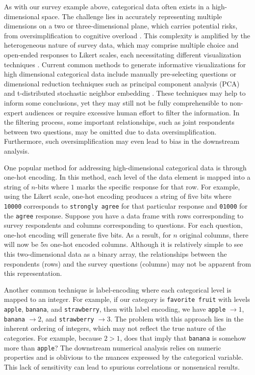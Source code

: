 As with our survey example above, categorical data often exists in a high-dimensional space. The challenge lies in accurately representing multiple dimensions on a two or three-dimensional plane, which carries potential risks, from oversimplification to cognitive overload \cite{fayyad2002information}. This complexity is amplified by the heterogeneous nature of survey data, which may comprise multiple choice and open-ended responses to Likert scales, each necessitating different visualization techniques \cite{shneiderman1996eyes}. Current common methods to generate informative visualizations for high dimensional categorical data include manually pre-selecting questions or dimensional reduction techniques such as principal component analysis (PCA) and t-distributed stochastic neighbor embedding \cite{Wong1997MultivariateVU}. These techniques may help to inform some conclusions, yet they may still not be fully comprehensible to non-expert audiences or require excessive human effort to filter the information. In the filtering process, some important relationships, such as joint respondents between two questions, may be omitted due to data oversimplification. Furthermore, such oversimplification may even lead to bias in the downstream analysis.

One popular method for addressing high-dimensional categorical data is through one-hot encoding. In this method, each level of the data element is mapped into a string of $n$-bits where $1$ marks the specific response for that row. For example, using the Likert scale, one-hot encoding produces a string of five bits where \texttt{10000} corresponds to \texttt{strongly agree} for that particular response and \texttt{01000} for the \texttt{agree} response. Suppose you have a data frame with rows corresponding to survey respondents and columns corresponding to questions. For each question, one-hot encoding will generate five bits. As a result, for $n$ original columns, there will now be $5n$ one-hot encoded columns. Although it is relatively simple to see this two-dimensional data as a binary array, the relationships between the respondents (rows) and the survey questions (columns) may not be apparent from this representation.

Another common technique is label-encoding where each categorical level is mapped to an integer. For example, if our category is \texttt{favorite fruit} with levels \texttt{apple}, \texttt{banana}, and \texttt{strawberry}, then with label encoding, we have \texttt{apple} $\rightarrow 1$, \texttt{banana} $\rightarrow 2$, and \texttt{strawberry} $\rightarrow 3$. The problem with this approach lies in the inherent ordering of integers, which may not reflect the true nature of the categories. For example, because $2 > 1$, does that imply that \texttt{banana} is somehow more than \texttt{apple}? The downstream numerical analysis relies on numeric properties and is oblivious to the nuances expressed by the categorical variable. This lack of sensitivity can lead to spurious correlations or nonsensical results.

